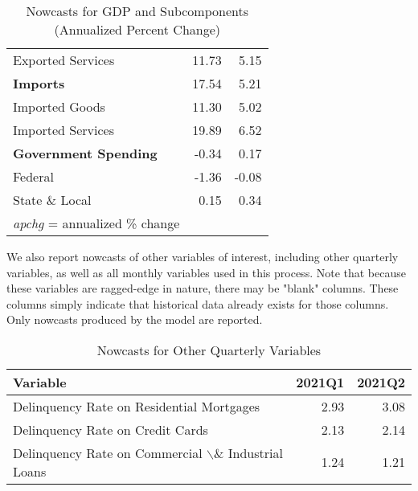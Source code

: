 \documentclass[11pt, letterpaper]{article}\usepackage[]{graphicx}\usepackage[]{color}
\begin{document}
\begin{table}[H]
\begin{tabular}{lrr}
  \hspace{8mm}  Exported Services & 11.73 & 5.15 \\ 
  \hspace{0mm} \textbf{Imports} & 17.54 & 5.21 \\ 
  \hspace{8mm}  Imported Goods & 11.30 & 5.02 \\ 
  \hspace{8mm}  Imported Services & 19.89 & 6.52 \\ 
  \hspace{0mm} \textbf{Government Spending} & -0.34 & 0.17 \\ 
  \hspace{8mm}  Federal & -1.36 & -0.08 \\ 
  \hspace{8mm}  State \& Local & 0.15 & 0.34 \\ 
   \hline 
 \textit{apchg} = annualized \% change 
\end{tabular}
\endgroup
\caption{Nowcasts for GDP and Subcomponents (Annualized Percent Change)} 
\end{table}


We also report nowcasts of other variables of interest, including other quarterly variables, as well as all monthly variables used in this process. Note that because these variables are ragged-edge in nature, there may be "blank" columns. These columns simply indicate that historical data already exists for those columns. Only nowcasts produced by the model are reported.
\begin{table}[H]
\centering
\begingroup\fontsize{11pt}{13pt}\selectfont
\begin{tabular}{lrr}
  \hline
Variable & 2021Q1 & 2021Q2 \\ 
  \hline
Delinquency Rate on Residential Mortgages & 2.93 & 3.08 \\ 
  Delinquency Rate on Credit Cards & 2.13 & 2.14 \\ 
  Delinquency Rate on Commercial $\backslash$\& Industrial Loans & 1.24 & 1.21 \\ 
   \hline
\end{tabular}
\endgroup
\caption{Nowcasts for Other Quarterly Variables} 
\end{table}
\end{document}
